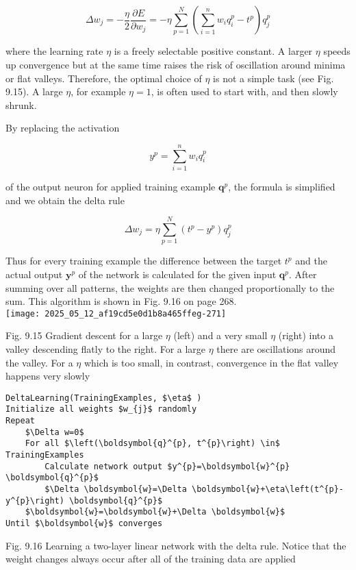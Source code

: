 \documentclass[10pt]{article}
\begin{document}
$$
\Delta w_{j}=-\frac{\eta}{2} \frac{\partial E}{\partial w_{j}}=-\eta \sum_{p=1}^{N}\left(\sum_{i=1}^{n} w_{i} q_{i}^{p}-t^{p}\right) q_{j}^{p}
$$

where the learning rate $\eta$ is a freely selectable positive constant. A larger $\eta$ speeds up convergence but at the same time raises the risk of oscillation around minima or flat valleys. Therefore, the optimal choice of $\eta$ is not a simple task (see Fig. 9.15). A large $\eta$, for example $\eta=1$, is often used to start with, and then slowly shrunk.

By replacing the activation

$$
y^{p}=\sum_{i=1}^{n} w_{i} q_{i}^{p}
$$

of the output neuron for applied training example $\boldsymbol{q}^{p}$, the formula is simplified and we obtain the delta rule

$$
\Delta w_{j}=\eta \sum_{p=1}^{N}\left(t^{p}-y^{p}\right) q_{j}^{p}
$$

Thus for every training example the difference between the target $t^{p}$ and the actual output $\boldsymbol{y}^{p}$ of the network is calculated for the given input $\boldsymbol{q}^{p}$. After summing over all patterns, the weights are then changed proportionally to the sum. This algorithm is shown in Fig. 9.16 on page 268.\\
\texttt{[image: 2025\_05\_12\_af19cd5e0d1b8a465ffeg-271]}

Fig. 9.15 Gradient descent for a large $\eta$ (left) and a very small $\eta$ (right) into a valley descending flatly to the right. For a large $\eta$ there are oscillations around the valley. For a $\eta$ which is too small, in contrast, convergence in the flat valley happens very slowly

\begin{verbatim}
DeltaLearning(TrainingExamples, $\eta$ )
Initialize all weights $w_{j}$ randomly
Repeat
    $\Delta w=0$
    For all $\left(\boldsymbol{q}^{p}, t^{p}\right) \in$ TrainingExamples
        Calculate network output $y^{p}=\boldsymbol{w}^{p} \boldsymbol{q}^{p}$
        $\Delta \boldsymbol{w}=\Delta \boldsymbol{w}+\eta\left(t^{p}-y^{p}\right) \boldsymbol{q}^{p}$
    $\boldsymbol{w}=\boldsymbol{w}+\Delta \boldsymbol{w}$
Until $\boldsymbol{w}$ converges
\end{verbatim}

Fig. 9.16 Learning a two-layer linear network with the delta rule. Notice that the weight changes always occur after all of the training data are applied
\end{document}
